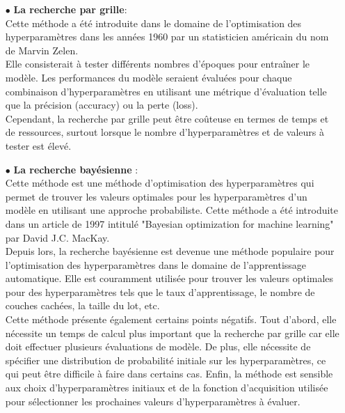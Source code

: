 \begin{itemize}
    \item [$\bullet$]\textbf{La recherche par grille}:\\
    Cette méthode a été introduite dans le domaine de l'optimisation des hyperparamètres dans les années 1960 par un statisticien américain du nom de Marvin Zelen.\\
Elle consisterait à tester différents nombres d'époques pour entraîner le modèle. Les performances du modèle seraient évaluées pour chaque combinaison d'hyperparamètres en utilisant une métrique d'évaluation telle que la précision (accuracy) ou la perte (loss).\\
Cependant, la recherche par grille peut être coûteuse en termes de temps et de ressources, surtout lorsque le nombre d'hyperparamètres et de valeurs à tester est élevé. 

\vspace{1cm}
\item [$\bullet$]\textbf{La recherche bayésienne }:\\
Cette méthode est une méthode d'optimisation des hyperparamètres qui permet de trouver les valeurs optimales pour les hyperparamètres d'un modèle en utilisant une approche probabiliste. Cette méthode a été introduite dans un article de 1997 intitulé "Bayesian optimization for machine learning" par David J.C. MacKay.\\
Depuis lors, la recherche bayésienne est devenue une méthode populaire pour l'optimisation des hyperparamètres dans le domaine de l'apprentissage automatique. Elle est couramment utilisée pour trouver les valeurs optimales pour des hyperparamètres tels que le taux d'apprentissage, le nombre de couches cachées, la taille du lot, etc.\\
 Cette méthode présente également certains points négatifs. Tout d'abord, elle nécessite un temps de calcul plus important que la recherche par grille car elle doit effectuer plusieurs évaluations de modèle. De plus, elle nécessite de spécifier une distribution de probabilité initiale sur les hyperparamètres, ce qui peut être difficile à faire dans certains cas. Enfin, la méthode est sensible aux choix d'hyperparamètres initiaux et de la fonction d'acquisition utilisée pour sélectionner les prochaines valeurs d'hyperparamètres à évaluer.
\end{itemize}
\vspace{1.25cm}

